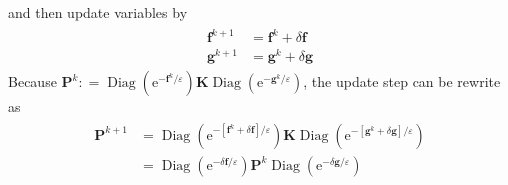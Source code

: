 \documentclass{article}
\begin{document}
and then update variables by
\begin{align}
\begin{aligned}  \mathbf {f} ^ { k + 1 } & =  \mathbf {f} ^ { k } + \delta  \mathbf {f} \\  \mathbf {g} ^ { k + 1 } & =  \mathbf {g} ^ { k } + \delta  \mathbf {g} \end{aligned}
\end{align}
Because $ \mathbf {P} ^ { k } : = \operatorname { Diag } \left( \mathrm { e } ^ { -  \mathbf {f} ^ { k } / \varepsilon } \right) \mathbf { K} \operatorname { Diag } \left( \mathrm { e } ^ { -  \mathbf {g} ^ { k } / \varepsilon } \right)$, the update step can be rewrite as
\begin{align}
\begin{aligned}  \mathbf {P} ^ { k + 1 } & = \operatorname { Diag } \left( \mathrm { e } ^ { - \left[  \mathbf {f} ^ { k } + \delta  \mathbf {f} \right] / \varepsilon } \right)  \mathbf {K} \operatorname { Diag } \left( \mathrm { e } ^ { - \left[  \mathbf {g} ^ { k } + \delta  \mathbf {g} \right] / \varepsilon } \right) \\ & = \operatorname { Diag } \left( \mathrm { e } ^ { - \delta  \mathbf {f} / \varepsilon } \right)  \mathbf {P} ^ { k } \operatorname { Diag } \left( \mathrm { e } ^ { - \delta  \mathbf {g} / \varepsilon } \right) \end{aligned}
\end{align}
\end{document}
